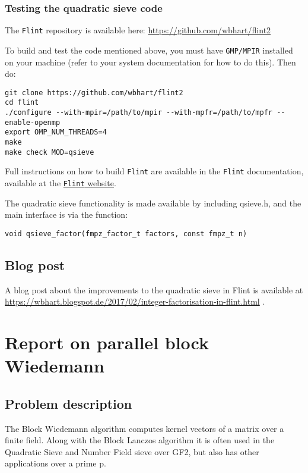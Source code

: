 \subsubsection{Testing the quadratic sieve
code}\label{testing-the-quadratic-sieve-code}

The \texttt{Flint} repository is available here:
\url{https://github.com/wbhart/flint2}

To build and test the code mentioned above, you must have
\texttt{GMP/MPIR} installed on your machine (refer to your system
documentation for how to do this). Then do:

\begin{verbatim}
git clone https://github.com/wbhart/flint2
cd flint
./configure --with-mpir=/path/to/mpir --with-mpfr=/path/to/mpfr --enable-openmp
export OMP_NUM_THREADS=4
make
make check MOD=qsieve
\end{verbatim}

Full instructions on how to build \texttt{Flint} are available in the
\texttt{Flint} documentation, available at the
\href{http://flintlib.org}{\texttt{Flint} website}.

The quadratic sieve functionality is made available by including
qsieve.h, and the main interface is via the function:

\begin{verbatim}
void qsieve_factor(fmpz_factor_t factors, const fmpz_t n)
\end{verbatim}

\subsection{Blog post}\label{blog-post}

A blog post about the improvements to the quadratic sieve in Flint is
available at
\url{https://wbhart.blogspot.de/2017/02/integer-factorisation-in-flint.html}
.

\section*{Report on parallel block
Wiedemann}\label{report-on-parallel-block-wiedemann}

\subsection{Problem description}\label{problem-description-1}

The Block Wiedemann algorithm computes kernel vectors of a matrix over a
finite field. Along with the Block Lanczos algorithm it is often used in
the Quadratic Sieve and Number Field sieve over GF2, but also has other
applications over a prime p.

